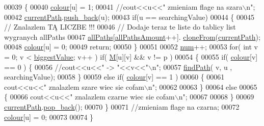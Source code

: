 \begin{DoxyCode}
00039                                                     \{
00040          \hyperlink{class_graph_aa13a7c7c066a77cc6dd21e4380deb649}{colour}[u] = 1;
00041          \textcolor{comment}{//cout<<u<<" zmieniam flage na szara\(\backslash\)n";}
00042          \hyperlink{class_d_f_s_aa3bf5c11cd2d66fc893e232eb1e42c76}{currentPath}.\hyperlink{class_linked_list_a719c7b47925171fd7a72a35d0a581619}{push\_back}(u);
00043          \textcolor{keywordflow}{if}(u == searchingValue)
00044                  \{
00045                          \textcolor{comment}{// Znalazlem TĄ LICZBE !!!}
00046                          \textcolor{comment}{// Dodaje teraz te liste do tablicy list wygranych allPaths}
00047                          \hyperlink{class_d_f_s_a48dd546aaa57234bcd6e54a0f01b3f48}{allPaths}[\hyperlink{class_d_f_s_a53269340075995e432c355638ce30554}{allPathsAmount}++].
      \hyperlink{class_list_a8a1ebc7ce83d77b83f58bd8c2ce2d683}{cloneFrom}(\hyperlink{class_d_f_s_aa3bf5c11cd2d66fc893e232eb1e42c76}{currentPath});
00048                         \hyperlink{class_graph_aa13a7c7c066a77cc6dd21e4380deb649}{colour}[u] = 0;
00049                          \textcolor{keywordflow}{return};
00050                  \}
00051 
00052          \hyperlink{class_graph_a895fee5bcf86093c8f57de9ed2304d8e}{num}++;
00053          \textcolor{keywordflow}{for}( \textcolor{keywordtype}{int} v = 0; v < \hyperlink{class_graph_a73d1b5ba16c84f8eb1f6cf009b8ea532}{biggestValue}; v++ ) \textcolor{keywordflow}{if}( \hyperlink{class_graph_ae948381c05ffc60825e5810328c0451c}{M}[u][v] && v != p )
00054          \{
00055              \textcolor{keywordflow}{if}( \hyperlink{class_graph_aa13a7c7c066a77cc6dd21e4380deb649}{colour}[v] == 0 ) \{
00056                  \textcolor{comment}{//cout<<u<<" -> "<<v<<"\(\backslash\)n";}
00057                  \hyperlink{class_d_f_s_a1d8f16ae45bf27ea6681236f5a4ba7f9}{findPath}( v, u , searchingValue);
00058              \}
00059              \textcolor{keywordflow}{else} \textcolor{keywordflow}{if}( \hyperlink{class_graph_aa13a7c7c066a77cc6dd21e4380deb649}{colour}[v] == 1 )
00060              \{
00061                  cout<<u<<\textcolor{stringliteral}{" znalazlem szare wiec sie cofam\(\backslash\)n"};
00062 
00063              \}
00064              \textcolor{keywordflow}{else}
00065              \{
00066                  cout<<u<<\textcolor{stringliteral}{" znalazlem czarne wiec sie cofam\(\backslash\)n"};
00067 
00068              \}
00069              \hyperlink{class_d_f_s_aa3bf5c11cd2d66fc893e232eb1e42c76}{currentPath}.\hyperlink{class_linked_list_ad7634e21b0ccd370906c4f28baaffa38}{pop\_back}();
00070          \}
00071          \textcolor{comment}{//zmieniam flage na czarna;}
00072          \hyperlink{class_graph_aa13a7c7c066a77cc6dd21e4380deb649}{colour}[u] = 0;
00073 
00074      \}
\end{DoxyCode}
